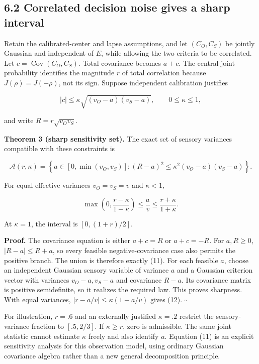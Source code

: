 \documentclass[
  11pt,
]{article}
\let\ctdoldsubsection\subsection
\renewcommand{\subsection}{\Needspace{6\baselineskip}\ctdoldsubsection}
\begin{document}
\hypertarget{correlated-decision-noise-gives-a-sharp-interval}{%
\subsection{6.2 Correlated decision noise gives a sharp
interval}\label{correlated-decision-noise-gives-a-sharp-interval}}

Retain the calibrated-center and lapse assumptions, and let
\((C_O,C_S)\) be jointly Gaussian and independent of \(E\), while
allowing the two criteria to be correlated. Let
\(c=\operatorname{Cov}(C_O,C_S)\). Total covariance becomes \(a+c\). The
central joint probability identifies the magnitude \(r\) of total
correlation because \(J(\rho)=J(-\rho)\), not its sign. Suppose
independent calibration justifies

\[
|c|\leq\kappa\sqrt{(v_O-a)(v_S-a)},\qquad 0\leq\kappa\leq1,
\]

and write \(R=r\sqrt{v_Ov_S}\).

\textbf{Theorem 3 (sharp sensitivity set).} The exact set of sensory
variances compatible with these constraints is

\[
\mathcal A(r,\kappa)=
\left\{a\in[0,\min(v_O,v_S)]:
(R-a)^2\leq\kappa^2(v_O-a)(v_S-a)\right\}.
\tag{11}
\]

For equal effective variances \(v_O=v_S=v\) and \(\kappa<1\),

\[
\boxed{\quad
\max\!\left(0,\frac{r-\kappa}{1-\kappa}\right)
\leq\frac av\leq\frac{r+\kappa}{1+\kappa}.
\quad}
\tag{12}
\]

At \(\kappa=1\), the interval is \([0,(1+r)/2]\).

\textbf{Proof.} The covariance equation is either \(a+c=R\) or
\(a+c=-R\). For \(a,R\geq0\), \(|R-a|\leq R+a\), so every feasible
negative-covariance case also permits the positive branch. The union is
therefore exactly (11). For each feasible \(a\), choose an independent
Gaussian sensory variable of variance \(a\) and a Gaussian criterion
vector with variances \(v_O-a,v_S-a\) and covariance \(R-a\). Its
covariance matrix is positive semidefinite, so it realizes the required
law. This proves sharpness. With equal variances,
\(|r-a/v|\leq\kappa(1-a/v)\) gives (12). \(\square\)

For illustration, \(r=.6\) and an externally justified \(\kappa=.2\)
restrict the sensory-variance fraction to \([.5,2/3]\). If
\(\kappa\geq r\), zero is admissible. The same joint statistic cannot
estimate \(\kappa\) freely and also identify \(a\). Equation (11) is an
explicit sensitivity analysis for this observation model, using ordinary
Gaussian covariance algebra rather than a new general decomposition
principle.
\end{document}
